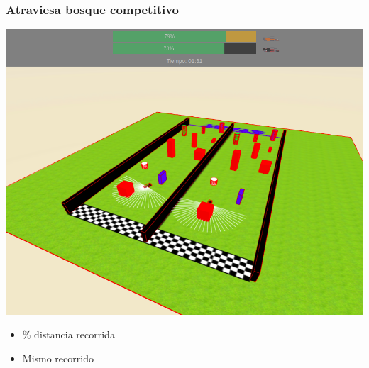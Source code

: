 \documentclass[xcolor={table}]{beamer}
\begin{document}
		\begin{frame}
			\frametitle{Atraviesa bosque competitivo}
			
	\begin{minipage}{.48\textwidth}
      \includegraphics[scale=0.18]{img/evaluador_forest.png}
        \end{minipage}
      \begin{minipage}{.50\textwidth}
      \begin{itemize}
      \begin{itemize}{}\itemsep5pt
          \item \% distancia recorrida
          \item Mismo recorrido 
      \end{itemize}
       \end{itemize}
    \end{minipage}
		\end{frame}
		
\end{document}
